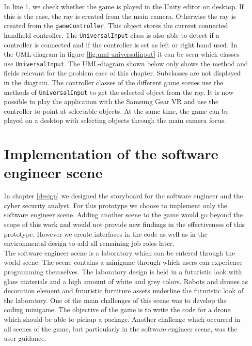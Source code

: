 \label{raycastcode-combined}
\vspace{1cm}
In line 1, we check whether the game is played in the Unity editor on desktop. If this is the case, the ray is created from the main camera. Otherwise the ray is created from the \texttt{gameController}. This object stores the current connected handheld controller.
The \texttt{UniversalInput} class is also able to detect if a controller is connected and if the controller is set as left or right hand used. In the UML-diagram in figure \ref{fig:uml-universalinput} it can be seen which classes use \texttt{UniversalInput}. The UML-diagram shown below only shows the method and fields relevant for the problem case of this chapter. Subclasses are not displayed in the diagram. The controller classes of the different game scenes use the methods of \texttt{UniversalInput} to get the selected object from the ray. It is now possible to play the application with the Samsung Gear VR and use the controller to point at selectable objects. At the same time, the game can be played on a desktop with selecting objects through the main camera focus.

\section{Implementation of the software engineer scene}
In chapter \ref{design} we designed the storyboard for the software engineer and the cyber security analyst. For this prototype we choose to implement only the software engineer scene. Adding another scene to the game would go beyond the scope of this work and would not provide new findings in the effectiveness of this prototype. However we create interfaces in the code as well as in the environmental design to add all remaining job roles later.\\
The software engineer scene is a laboratory which can be entered through the world scene. The scene contains a minigame through which users can experience programming themselves. The laboratory design is held in a futuristic look with glass materials and a high amount of white and grey colors. Robots and drones as decoration element and futuristic furniture assets underline the futuristic look of the laboratory. One of the main challenges of this scene was to develop the coding minigame. The objective of the game is to write the code for a drone which should be able to pickup a package. Another challenge which occurred in all scenes of the game, but particularly in the software engineer scene, was the user guidance.
